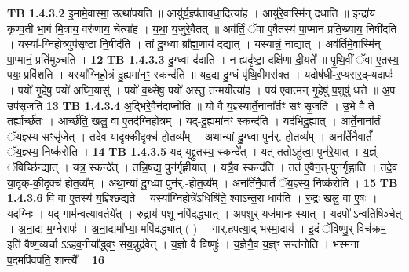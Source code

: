 \documentclass[17pt]{extarticle}
\begin{document}
                  \newline
                                \textbf{ TB 1.4.3.2} \newline
                  इ॒मामे॒वास्मा॒ उत्था॑पयति ॥ आयु॑र्य॒ज्ञ्प॑तावधा॒दित्या॑ह । आयु॑रे॒वास्मि॑न् दधाति ॥ इन्द्रा॑य कृण्व॒ती भा॒गं मि॒त्राय॒ वरु॑णाय॒ चेत्या॑ह । य॒था॒ य॒जुरे॒वैतत् ॥ अव॑र्तिं॒ ॅवा ए॒षैतस्य॑ पा॒प्मानं॑ प्रति॒ख्याय॒ निषी॑दति । यस्या᳚-ग्निहो॒त्र्युप॑सृष्टा नि॒षीद॑ति । तां दु॒ग्ध्वा ब्रा᳚ह्म॒णाय॑ दद्यात् । यस्यान्नं॒ नाद्यात् । अव॑र्तिमे॒वास्मि॑न् पा॒प्मानं॒ प्रति॑मुञ्चति । \textbf{ 12} \newline
                  \newline
                                \textbf{ TB 1.4.3.3} \newline
                  दु॒ग्ध्वा द॑दाति । न ह्यदृ॑ष्टा॒ दक्षि॑णा दी॒यते᳚ ॥ पृ॒थि॒वीं ॅवा ए॒तस्य॒ पयः॒ प्रवि॑शति । यस्या᳚ग्निहो॒त्रं दु॒ह्यमा॑नꣳ॒॒ स्कन्द॑ति ॥ यद॒द्य दु॒ग्धं पृ॑थि॒वीमस॑क्त । यदोष॑धी-र॒प्यस॑र॒द्-यदापः॑ । पयो॑ गृ॒हेषु॒ पयो॑ अघ्नि॒यासु॑ । पयो॑ व॒थ्सेषु॒ पयो॑ अस्तु॒ तन्मयीत्या॑ह । पय॑ ए॒वात्मन् गृ॒हेषु॑ प॒शुषु॑ धत्ते ॥ अ॒प उप॑सृजति \textbf{ 13} \newline
                  \newline
                                \textbf{ TB 1.4.3.4} \newline
                  अ॒द्भिरे॒वैन॑दाप्नोति ॥ यो वै य॒ज्ञ्स्यार्ते॒नाना᳚र्तꣳ सꣳ सृ॒जति॑ । उ॒भे वै ते तर्ह्यार्च्छ॑तः । आर्च्छ॑ति॒ खलु॒ वा ए॒तद॑ग्निहो॒त्रम् । यद्-दु॒ह्यमा॑नꣳ॒॒ स्कन्द॑ति । यद॑भिदु॒ह्यात् । आर्ते॒नाना᳚र्तं ॅय॒ज्ञ्स्य॒ सꣳसृ॑जेत् । तदे॒व या॒दृक्की॒दृक्च॑ होत॒व्य᳚म् । अथा॒न्यां दु॒ग्ध्वा पुन॑र्.-होत॒व्य᳚म् । अना᳚र्तेनै॒वार्तं॑ ॅय॒ज्ञ्स्य॒ निष्क॑रोति । \textbf{ 14} \newline
                  \newline
                                \textbf{ TB 1.4.3.5} \newline
                  यद्-युद्द्रु॑तस्य॒ स्कन्दे᳚त् । यत् ततोऽहु॑त्वा॒ पुन॑रे॒यात् । य॒ज्ञ्ं ॅविच्छि॑न्द्यात् । यत्र॒ स्कन्दे᳚त् । तन्नि॒षद्य॒ पुन॑र्गृह्णीयात् । यत्रै॒व स्कन्द॑ति । तत॑ ए॒वैन॒त्-पुन॑र्गृह्णाति । तदे॒व या॒दृक्-की॒दृक्च॑ होत॒व्य᳚म् । अथा॒न्यां दु॒ग्ध्वा पुन॑र्.-होत॒व्य᳚म् । अना᳚र्तेनै॒वार्तं॑ ॅय॒ज्ञ्स्य॒ निष्क॑रोति । \textbf{ 15} \newline
                  \newline
                                \textbf{ TB 1.4.3.6} \newline
                  वि वा ए॒तस्य॑ य॒ज्ञ्श्छि॑द्यते । यस्या᳚ग्निहो॒त्रे॑ऽधिश्रि॑ते॒ श्वाऽन्त॒रा धाव॑ति । रु॒द्रः खलु॒ वा ए॒षः । यद॒ग्निः । यद्-गाम॑न्वत्याव॒र्तये᳚त् । रु॒द्राय॑ प॒शू-नपि॑दद्ध्यात् । अ॒प॒शुर्-यज॑मानः स्यात् । यद॒पो᳚ ऽन्वतिषि॒ञ्चेत् । अ॒ना॒द्य-म॒ग्नेरापः॑ । अ॒ना॒द्यमा᳚भ्या॒-मपि॑दद्ध्यात् ( ) । गार्.ह॑पत्या॒द्-भस्मा॒दाय॑ । इ॒दं ॅविष्णु॒र्-विच॑क्रम॒ इति॑ वैष्ण॒व्यर्चा ऽऽह॑व॒नीया᳚द्ध्वꣳ॒॒ सय॒न्नुद्र॑वेत् । य॒ज्ञो वै विष्णुः॑ । य॒ज्ञेनै॒व य॒ज्ञ्ꣳ सन्त॑नोति । भस्म॑ना प॒दमपि॑वपति॒ शान्त्यै᳚ । \textbf{ 16} \newline
\end{document}
